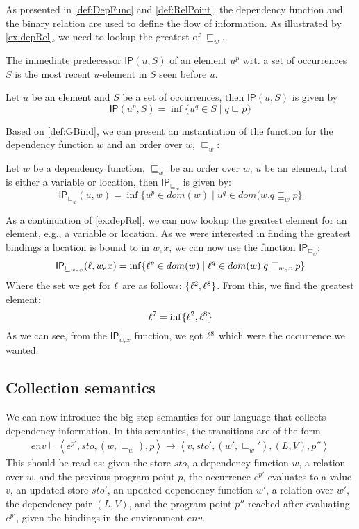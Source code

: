 \documentclass[acmsmall,sigplan]{acmart}
\newcommand{\uf}{\ensuremath{\mathsf{IP}}}
\begin{document}
As presented in \cref{def:DepFunc} and \cref{def:RelPoint}, the
dependency function and the binary relation are used to define the
flow of information. As illustrated by \cref{ex:depRel}, we need to
lookup the greatest of $\sqsubseteq_w$. 

The immediate predecessor $\uf(u,S)$ of an element $u^p$ wrt. a set of occurrences $S$ is
the most recent $u$-element in $S$ seen before $u$. 

\begin{definition}\label{def:GBind}
  Let $u$ be an element and $S$ be a set of occurrences, then
  $\uf(u,S)$ is given by
\[ \uf(u^p,S)=\inf\{u^q\in S\mid q\sqsubseteq p\} \]
\end{definition}

Based on \cref{def:GBind}, we can present an instantiation of the function for the dependency function $w$ and an order over $w$, $\sqsubseteq_w$:

\begin{definition}[]
	Let $w$ be a dependency function, $\sqsubseteq_w$ be an order over $w$, $u$ be an element, that is either a variable or location, then $\uf_{\sqsubseteq_w}$ is given by:
	$$\uf_{\sqsubseteq_w}(u,w)=\inf\{u^p\in dom(w)\mid u^q\in dom(w.q\sqsubseteq_w p\}$$
\end{definition}


\begin{example}[]\label{ex:deplookup}
	As a continuation of \cref{ex:depRel}, we can now lookup the greatest element for an element, e.g., a variable or location.
	As we were interested in finding the greatest bindings a location is bound to in $w_ex$, we can now use the function $\uf_{\sqsubseteq_w}$:
	$$\uf_{\sqsubseteq_{w_ex}}(\loc,w_ex)=\inf\{\loc^p\in dom(w)\mid \loc^q\in dom(w). q\sqsubseteq_{w_ex} p\}$$
	Where the set we get for $\ell$ are as follows: $\{\ell^2,\ell^8\}$.
	From this, we find the greatest element:
	$$\ell^7=\inf\{\ell^2,\ell^8\}$$
	As we can see, from the $\uf_{w_ex}$ function, we got $\ell^8$ which were the occurrence we wanted.
\end{example}

\subsection{Collection semantics}\label{sec:sem}

We can now introduce the big-step semantics for our language that
collects dependency information. In this semantics, the transitions
are of the form
%
\begin{align*}
env\vdash\left\langle e^{p'},sto,(w,\sqsubseteq_w),p\right\rangle\rightarrow\left\langle v,sto',(w',\sqsubseteq_w'),(L,V),p''\right\rangle
\end{align*}
%
This should be read as: given the store $sto$, a dependency function
$w$, a relation over $w$, and the previous program point $p$, the
occurrence $e^{p'}$ evaluates to a value $v$, an updated store $sto'$,
an updated dependency function $w'$, a relation over $w'$, the
dependency pair $(L,V)$, and the program point $p''$ reached after
evaluating $e^{p'}$, given the bindings in the environment $env$. 
\end{document}
